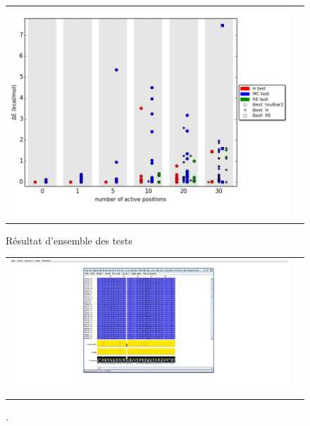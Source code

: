 \documentclass[a4paper,12pt]{article}
\begin{document}
    \clearpage
    
    \begin{figure}[h]
      \centering
      \begin{tabular}{cc} 
        \includegraphics[width=15cm]{graphe/all_result.png} &
      \end{tabular}
      
      \caption{Résultat d'ensemble des tests}
      \label{temps_CPU}
    \end{figure}
    
    
    \clearpage


    \clearpage
    
    \begin{figure}[h]
      \centering
      \begin{tabular}{cc} 
        \includegraphics[width=20cm]{image/align_1CKA.png} &
      \end{tabular}
      
      \caption{.}
      \label{temps_CPU}
    \end{figure}
    
\end{document}

